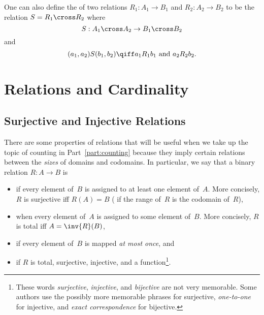 One can also define the  of two relations $R_1 : A_1 \to
B_1$ and $R_2 : A_2 \to B_2$ to be the relation $S = R_1 \cross R_2$
where
\begin{equation*}
    S : A_1 \cross A_2 \to B_1 \cross B_2
\end{equation*}
and
\begin{equation*}
    (a_1, a_2) S (b_1, b_2) \qiff a_1 R_1 b_1 \text{ and } a_2 R_2 b_2.
\end{equation*}

\section{Relations and Cardinality}\label{sec:relations_cardinality}

\subsection{Surjective and Injective
  Relations}\label{sec:surj-inj-rels}

There are some properties of relations that will be useful when we
take up the topic of counting in Part~\ref{part:counting} because they
imply certain relations between the \emph{sizes} of domains and
codomains.  In particular, we say that a binary relation $R: A \to B$
is
\begin{itemize}

\item
{} if every element of~$B$ is assigned to at least one
element of~$A$.  More concisely, $R$ is surjective iff $R(A) = B$ (\ie
if the range of~$R$ is the codomain of~$R$),

\item
{} when every element of~$A$ is assigned to some element
of~$B$.  More concisely, $R$ is total iff $A = \inv{R}(B)$,

\item
{} if every element of~$B$ is mapped \emph{at most
  once}, and

\item
{} if $R$ is total, surjective, injective, and a
function\footnote{These words \emph{surjective}, \emph{injective}, and
  \emph{bijective} are not very memorable.  Some authors use the
  possibly more memorable phrases  for surjective,
  \emph{one-to-one} for injective, and \emph{exact correspondence} for
  bijective.}.

\end{itemize}

